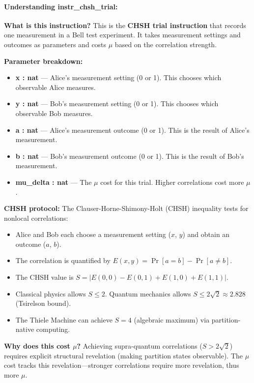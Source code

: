 \paragraph{Understanding instr\_chsh\_trial:}

\textbf{What is this instruction?} This is the \textbf{CHSH trial instruction} that records one measurement in a Bell test experiment. It takes measurement settings and outcomes as parameters and costs $\mu$ based on the correlation strength.

\textbf{Parameter breakdown:}
\begin{itemize}
    \item \textbf{x : nat} — Alice's measurement setting (0 or 1). This chooses which observable Alice measures.
    \item \textbf{y : nat} — Bob's measurement setting (0 or 1). This chooses which observable Bob measures.
    \item \textbf{a : nat} — Alice's measurement outcome (0 or 1). This is the result of Alice's measurement.
    \item \textbf{b : nat} — Bob's measurement outcome (0 or 1). This is the result of Bob's measurement.
    \item \textbf{mu\_delta : nat} — The $\mu$ cost for this trial. Higher correlations cost more $\mu$.
\end{itemize}

\textbf{CHSH protocol:} The Clauser-Horne-Shimony-Holt (CHSH) inequality tests for nonlocal correlations:
\begin{itemize}
    \item Alice and Bob each choose a measurement setting ($x$, $y$) and obtain an outcome ($a$, $b$).
    \item The correlation is quantified by $E(x,y) = \Pr[a=b] - \Pr[a \neq b]$.
    \item The CHSH value is $S = |E(0,0) - E(0,1) + E(1,0) + E(1,1)|$.
    \item Classical physics allows $S \leq 2$. Quantum mechanics allows $S \leq 2\sqrt{2} \approx 2.828$ (Tsirelson bound).
    \item The Thiele Machine can achieve $S = 4$ (algebraic maximum) via partition-native computing.
\end{itemize}

\textbf{Why does this cost $\mu$?} Achieving supra-quantum correlations ($S > 2\sqrt{2}$) requires explicit structural revelation (making partition states observable). The $\mu$ cost tracks this revelation---stronger correlations require more revelation, thus more $\mu$.


